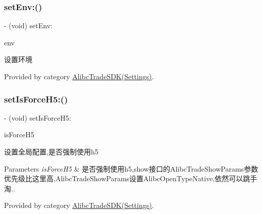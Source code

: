 \subsubsection{\texorpdfstring{set\+Env\+:()}{setEnv:()}}
{\footnotesize\ttfamily -\/ (void) set\+Env\+: \begin{DoxyParamCaption}\item[{(Alibc\+Environment)}]{env }\end{DoxyParamCaption}}

设置环境 

Provided by category \mbox{\hyperlink{category_alibc_trade_s_d_k_07_settings_08_a08d8381b1c9bef18ff5ee50ced4747b4}{Alibc\+Trade\+S\+D\+K(\+Settings)}}.

\mbox{\label{interface_alibc_trade_s_d_k_aa0905a77885d33d44762a552acdcef2d}} 
\subsubsection{\texorpdfstring{set\+Is\+Force\+H5\+:()}{setIsForceH5:()}}
{\footnotesize\ttfamily -\/ (void) set\+Is\+Force\+H5\+: \begin{DoxyParamCaption}\item[{(B\+O\+OL)}]{is\+Force\+H5 }\end{DoxyParamCaption}}

设置全局配置,是否强制使用h5


\begin{DoxyParams}{Parameters}
{\em is\+Force\+H5} & 是否强制使用h5,show接口的\+Alibc\+Trade\+Show\+Params参数优先级比这里高,Alibc\+Trade\+Show\+Params设置\+Alibc\+Open\+Type\+Native,依然可以跳手淘.. \\
\hline
\end{DoxyParams}


Provided by category \mbox{\hyperlink{category_alibc_trade_s_d_k_07_settings_08_aa0905a77885d33d44762a552acdcef2d}{Alibc\+Trade\+S\+D\+K(\+Settings)}}.

\mbox{\label{interface_alibc_trade_s_d_k_a9e2f6b18663323c17cdcfa8fc42e0c32}} 

